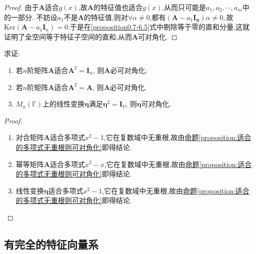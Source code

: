 \documentclass[../../main.tex]{subfiles}
\begin{document}
\begin{proof}
由于\(\boldsymbol{A}\)适合\(g(x)\),故\(\boldsymbol{A}\)的特征值也适合\(g(x)\),从而只可能是\(a_1,a_2,\cdots,a_m\)中的一部分. 
不妨设$a_1$不是$\boldsymbol{A}$的特征值,则对$\forall \alpha\ne 0$,都有$(\boldsymbol{A}-a_1\boldsymbol{I_n})\alpha \ne 0,$故$\mathrm{Ker}(\boldsymbol{A} - a_1\boldsymbol{I}_n)=0$.于是在\eqref{proposition0.7-6.5}式中剔除等于零的直和分量,这就证明了全空间等于特征子空间的直和,从而\(\boldsymbol{A}\)可对角化.
\end{proof}

\begin{example}\label{example0.7qew}
求证:
\begin{enumerate}[(1)]
\item 若\(n\)阶矩阵\(\boldsymbol{A}\)适合\(\boldsymbol{A}^2 = \boldsymbol{I}_n\), 则\(\boldsymbol{A}\)必可对角化;

\item 若\(n\)阶矩阵\(\boldsymbol{A}\)适合\(\boldsymbol{A}^2 = \boldsymbol{A}\), 则\(\boldsymbol{A}\)必可对角化.

\item \(M_n(\mathbb{F})\)上的线性变换\(\boldsymbol{\eta}\)满足\(\boldsymbol{\eta}^2 = \boldsymbol{I}_V\), 则\(\boldsymbol{\eta}\)可对角化.
\end{enumerate}
\end{example}
\begin{proof}
\begin{enumerate}[(1)]
\item 对合矩阵\(\boldsymbol{A}\)适合多项式\(x^2 - 1\),它在复数域中无重根,故由\hyperref[proposition:适合的多项式无重根则可对角化]{命题\ref{proposition:适合的多项式无重根则可对角化}}即得结论.

\item 幂等矩阵\(\boldsymbol{A}\)适合多项式\(x^2 - x\),它在复数域中无重根,故由\hyperref[proposition:适合的多项式无重根则可对角化]{命题\ref{proposition:适合的多项式无重根则可对角化}}即得结论.

\item 线性变换\(\boldsymbol{\eta}\)适合多项式$x^2-1$,它在复数域中无重根,故由\hyperref[proposition:适合的多项式无重根则可对角化]{命题\ref{proposition:适合的多项式无重根则可对角化}}即得结论.
\end{enumerate}
\end{proof}


\subsection{有完全的特征向量系}
\end{document}
